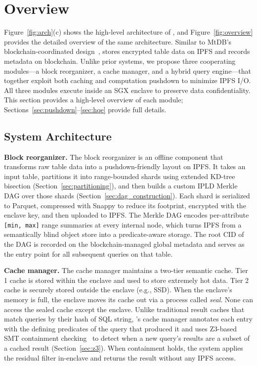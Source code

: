 \section{\ours{} Overview}
\label{sec:overview}
 
Figure~\ref{fig:arch}(c) shows the high-level architecture of \ours{}, and Figure~\ref{fig:overview} provides the detailed overview of the same architecture. Similar to MtDB's blockchain-coordinated design~\cite{hossain2025mtdb}, \ours{} stores encrypted table data on IPFS and records metadata on blockchain. Unlike prior systems, we propose three cooperating modules---a block reorganizer, a cache manager, and a hybrid query engine---that together exploit both caching and computation pushdown to minimize IPFS I/O. All three modules execute inside an SGX enclave to preserve data confidentiality. This section provides a high-level overview of each module; Sections~\ref{sec:pushdown}--\ref{sec:hqe} provide full details.
 
\subsection{System Architecture}
\label{sec:sys_arch}
 
\textbf{Block reorganizer.}
The block reorganizer is an offline component that transforms raw table data into a pushdown-friendly layout on IPFS. It takes an input table, partitions it into range-bounded shards using extended KD-tree bisection (Section~\ref{sec:partitioning}), and then builds a custom IPLD Merkle DAG over those shards (Section~\ref{sec:dag_construction}). Each shard is serialized to Parquet, compressed with Snappy to reduce its footprint, encrypted with the enclave key, and then uploaded to IPFS. The Merkle DAG encodes per-attribute \texttt{[min, max]} range summaries at every internal node, which turns IPFS from a semantically blind object store into a predicate-aware storage. The root CID of the DAG is recorded on the blockchain-managed global metadata and serves as the entry point for all subsequent queries on that table.
 
\textbf{Cache manager.}
The cache manager maintains a two-tier semantic cache. Tier 1 cache is stored within the enclave and used to store extremely hot data. Tier 2 cache is securely stored outside the enclave (e.g., SSD). When the enclave's memory is full, the enclave moves its cache out via a process called \textit{seal}. None can access the sealed cache except the enclave. Unlike traditional result caches that match queries by their hash of SQL string, \ours{}'s cache manager annotates each entry with the defining predicates of the query that produced it and uses Z3-based SMT containment checking~\cite{de2008z3} to detect when a new query's results are a subset of a cached result (Section~\ref{sec:z3}). When containment holds, the system applies the residual filter in-enclave and returns the result without any IPFS access. 

